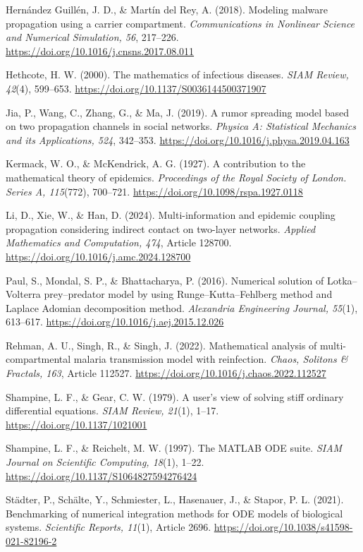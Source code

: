 \begin{flushleft}
\hangindent=1.27cm
Hernández Guillén, J. D., \& Martín del Rey, A. (2018). Modeling malware propagation using a carrier compartment. \textit{Communications in Nonlinear Science and Numerical Simulation, 56}, 217--226. \url{https://doi.org/10.1016/j.cnsns.2017.08.011}

\hangindent=1.27cm
Hethcote, H. W. (2000). The mathematics of infectious diseases. \textit{SIAM Review, 42}(4), 599--653. \url{https://doi.org/10.1137/S0036144500371907}

\hangindent=1.27cm
Jia, P., Wang, C., Zhang, G., \& Ma, J. (2019). A rumor spreading model based on two propagation channels in social networks. \textit{Physica A: Statistical Mechanics and its Applications, 524}, 342--353. \url{https://doi.org/10.1016/j.physa.2019.04.163}

\hangindent=1.27cm
Kermack, W. O., \& McKendrick, A. G. (1927). A contribution to the mathematical theory of epidemics. \textit{Proceedings of the Royal Society of London. Series A, 115}(772), 700--721. \url{https://doi.org/10.1098/rspa.1927.0118}

\hangindent=1.27cm
Li, D., Xie, W., \& Han, D. (2024). Multi-information and epidemic coupling propagation considering indirect contact on two-layer networks. \textit{Applied Mathematics and Computation, 474}, Article 128700. \url{https://doi.org/10.1016/j.amc.2024.128700}

\hangindent=1.27cm
Paul, S., Mondal, S. P., \& Bhattacharya, P. (2016). Numerical solution of Lotka--Volterra prey--predator model by using Runge--Kutta--Fehlberg method and Laplace Adomian decomposition method. \textit{Alexandria Engineering Journal, 55}(1), 613--617. \url{https://doi.org/10.1016/j.aej.2015.12.026}

\hangindent=1.27cm
Rehman, A. U., Singh, R., \& Singh, J. (2022). Mathematical analysis of multi-compartmental malaria transmission model with reinfection. \textit{Chaos, Solitons \& Fractals, 163}, Article 112527. \url{https://doi.org/10.1016/j.chaos.2022.112527}

\hangindent=1.27cm
Shampine, L. F., \& Gear, C. W. (1979). A user's view of solving stiff ordinary differential equations. \textit{SIAM Review, 21}(1), 1--17. \url{https://doi.org/10.1137/1021001}

\hangindent=1.27cm
Shampine, L. F., \& Reichelt, M. W. (1997). The MATLAB ODE suite. \textit{SIAM Journal on Scientific Computing, 18}(1), 1--22. \url{https://doi.org/10.1137/S1064827594276424}

\hangindent=1.27cm
Städter, P., Schälte, Y., Schmiester, L., Hasenauer, J., \& Stapor, P. L. (2021). Benchmarking of numerical integration methods for ODE models of biological systems. \textit{Scientific Reports, 11}(1), Article 2696. \url{https://doi.org/10.1038/s41598-021-82196-2}
\end{flushleft}
